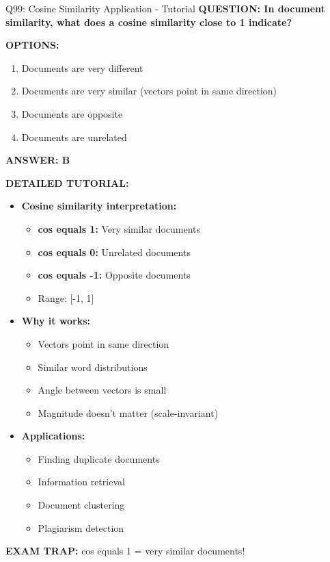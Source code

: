 \documentclass[8pt]{beamer}
\begin{document}
	\begin{frame}{Q99: Cosine Similarity Application - Tutorial}
		\fontsize{6.5}{7.5}\selectfont
		\textbf{QUESTION: In document similarity, what does a cosine similarity close to 1 indicate?}
		
		\vspace{0.1cm}
		\textbf{OPTIONS:}
		\begin{enumerate}
			\item Documents are very different
			\item Documents are very similar (vectors point in same direction)
			\item Documents are opposite
			\item Documents are unrelated
		\end{enumerate}
		
		\vspace{0.1cm}
		\textcolor{myblue}{\textbf{ANSWER: B}}
		
		\vspace{0.1cm}
		\textbf{DETAILED TUTORIAL:}
		\begin{itemize}
			\item \textbf{Cosine similarity interpretation:}
			\begin{itemize}
				\item \textbf{cos equals 1:} Very similar documents
				\item \textbf{cos equals 0:} Unrelated documents
				\item \textbf{cos equals -1:} Opposite documents
				\item Range: [-1, 1]
			\end{itemize}
			\item \textbf{Why it works:}
			\begin{itemize}
				\item Vectors point in same direction
				\item Similar word distributions
				\item Angle between vectors is small
				\item Magnitude doesn't matter (scale-invariant)
			\end{itemize}
			\item \textbf{Applications:}
			\begin{itemize}
				\item Finding duplicate documents
				\item Information retrieval
				\item Document clustering
				\item Plagiarism detection
			\end{itemize}
		\end{itemize}
		
		\textcolor{myred}{\textbf{EXAM TRAP:}} cos equals 1 = \textcolor{myblue}{very similar documents}!
	\end{frame}
	
\end{document}
